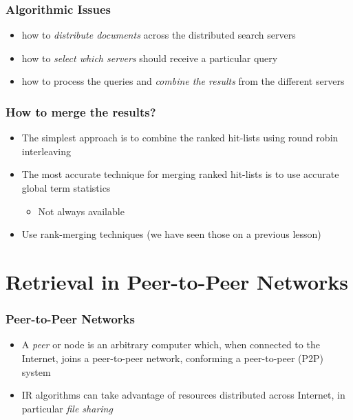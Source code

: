 \documentclass{beamer}
\begin{document}
\begin{frame}
    \frametitle{Algorithmic Issues}
    \begin{itemize}
    \item how to \emph{distribute documents} across the distributed search servers
    \item how to \emph{select which servers} should receive a particular query
    \item how to process the queries and \emph{combine the results} from the
        different servers
    \end{itemize}
\end{frame}

\begin{frame}
    \frametitle{How to merge the results?}
    \begin{itemize}
    \item The simplest approach is to combine the ranked hit-lists using round
        robin interleaving
    \item The most accurate technique for merging ranked hit-lists is to use
        accurate global term statistics
        \begin{itemize}
        \item Not always available
        \end{itemize}
    \item Use rank-merging techniques (we have seen those on a previous lesson)
    \end{itemize}
\end{frame}

\section{Retrieval in Peer-to-Peer Networks}

\begin{frame}
    \frametitle{Peer-to-Peer Networks}
    \begin{itemize}
    \item A \emph{peer} or node is an arbitrary computer which, when connected
        to the Internet, joins a peer-to-peer network, conforming a
        peer-to-peer (P2P) system
    \item IR algorithms can take advantage of resources distributed across
        Internet, in particular \emph{file sharing}
    \end{itemize}
\end{frame}
\end{document}

